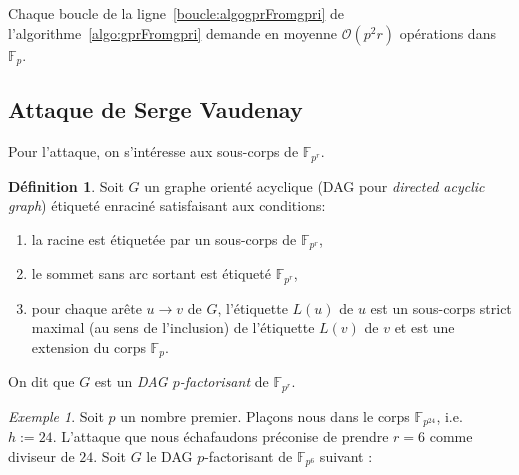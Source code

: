 \documentclass[a4paper, titlepage, 11pt]{article}
\theoremstyle{definition}
\newtheorem{defi}[theo]{Définition}
\theoremstyle{remark}
\newtheorem{exem}[theo]{Exemple}
\def\O{\mathcal O}
\def\gf #1{\mathbb{F}_{#1}}
\begin{document}
Chaque boucle de la ligne~\ref{boucle:algogprFromgpri} de l'algorithme~\ref{algo:gprFromgpri} demande en moyenne $\O(p^2r)$ opérations dans $\gf{p}$.

\subsection{Attaque de Serge Vaudenay}

Pour l'attaque, on s'intéresse aux sous-corps de $\gf{p^r}$.

\begin{defi}
Soit $G$ un graphe orienté acyclique (DAG pour \textit{directed acyclic graph}) étiqueté enraciné satisfaisant aux conditions: \begin{enumerate}
\item la racine est étiquetée par un sous-corps de $\gf{p^r}$,
\item le sommet sans arc sortant est étiqueté $\gf{p^r}$,
\item pour chaque arête $u \rightarrow v$ de $G$, l'étiquette $L(u)$ de $u$ est un sous-corps strict maximal (au sens de l'inclusion) de l'étiquette $L(v)$ de $v$ et est une extension du corps $\gf{p}$.
\end{enumerate}
On dit que $G$ est un \textit{DAG $p$-factorisant} de $\gf{p^r}$.
\end{defi}

\begin{exem}
Soit $p$ un nombre premier. Plaçons nous dans le corps $\gf{p^{24}}$, i.e. $h := 24$. L'attaque que nous échafaudons préconise de prendre $r = 6$ comme diviseur de $24$. Soit $G$ le DAG $p$-factorisant de $\gf{p^6}$ suivant :
\begin{figure}[h]
\begin{center}
\end{center}
\end{figure}
\end{exem}
\end{document}
